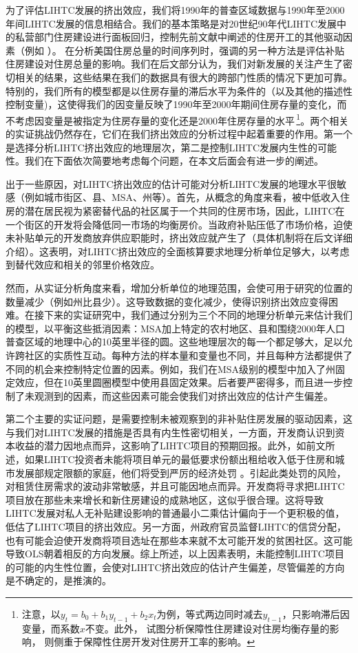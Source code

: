 \documentclass[lang=cn,11pt,a4paper]{paper}
\begin{document}
为了评估LIHTC发展的挤出效应，我们将1990年的普查区域数据与1990年至2000年间LIHTC发展的信息相结合。我们的基本策略是对20世纪90年代LIHTC发展中的私营部门住房建设进行面板回归，控制先前文献中阐述的住房开工的其他驱动因素（例如 \cite{Mayer200085}）。\cite{Murray1999107} 在分析美国住房总量的时间序列时，强调的另一种方法是评估补贴住房建设对住房总量的影响。我们在后文部分认为，我们对新发展的关注产生了密切相关的结果，这些结果在我们的数据具有很大的跨部门性质的情况下更加可靠。特别的，我们所有的模型都是以住房存量的滞后水平为条件的（以及其他的描述性控制变量)，这使得我们的因变量反映了1990年至2000年期间住房存量的变化，而不考虑因变量是被指定为住房存量的变化还是2000年住房存量的水平\,\footnote{注意，以$y_t=b_0+b_1y_{t-1}+b_2x_t$为例，等式两边同时减去$y_{t-1}$，只影响滞后因变量，而系数$x$不变。此外，\cite{Murray1999107} 试图分析保障性住房建设对住房均衡存量的影响，\cite{Murray1983590} 则侧重于保障性住房开发对住房开工率的影响。}。两个相关的实证挑战仍然存在，它们在我们挤出效应的分析过程中起着重要的作用。第一个是选择分析LIHTC挤出效应的地理层次，第二是控制LIHTC发展内生性的可能性。我们在下面依次简要地考虑每个问题，在本文后面会有进一步的阐述。

出于一些原因，对LIHTC挤出效应的估计可能对分析LIHTC发展的地理水平很敏感（例如城市街区、县、MSA、州等）。首先，从概念的角度来看，被中低收入住房的潜在居民视为紧密替代品的社区属于一个共同的住房市场，因此，LIHTC在一个街区的开发将会降低同一市场的均衡房价。当政府补贴压低了市场价格，迫使未补贴单元的开发商放弃供应职能时，挤出效应就产生了（具体机制将在后文详细介绍）。这表明，对LIHTC挤出效应的全面核算要求地理分析单位足够大，以考虑到替代效应和相关的邻里价格效应。

然而，从实证分析角度来看，增加分析单位的地理范围，会使可用于研究的位置的数量减少（例如州比县少）。这导致数据的变化减少，使得识别挤出效应变得困难。在接下来的实证研究中，我们通过分别为三个不同的地理分析单元来估计我们的模型，以平衡这些抵消因素：MSA加上特定的农村地区、县和围绕2000年人口普查区域的地理中心的10英里半径的圆。这些地理层次的每一个都足够大，足以允许跨社区的实质性互动。每种方法的样本量和变量也不同，并且每种方法都提供了不同的机会来控制特定位置的因素。例如，我们在MSA级别的模型中加入了州固定效应，但在10英里圆圈模型中使用县固定效果。后者要严密得多，而且进一步控制了未观测到的因素，而这些因素可能会使我们对挤出效应的估计产生偏差。

第二个主要的实证问题，是需要控制未被观察到的非补贴住房发展的驱动因素，这与我们对LIHTC发展的措施是否具有内生性密切相关，一方面，开发商认识到资本收益的潜力因地点而异，这影响了LIHTC项目的预期回报。此外，如前文所述，如果LIHTC投资者未能将项目单元的最低要求份额出租给收入低于住房和城市发展部规定限额的家庭，他们将受到严厉的经济处罚 \citep{Eriksen2009141}。引起此类处罚的风险，对租赁住房需求的波动非常敏感，并且可能因地点而异。开发商将寻求把LIHTC项目放在那些未来增长和新住房建设的成熟地区，这似乎很合理。这将导致LIHTC发展对私人无补贴建设影响的普通最小二乘估计偏向于一个更积极的值，低估了LIHTC项目的挤出效应。另一方面，州政府官员监督LIHTC的信贷分配，也有可能会迫使开发商将项目选址在那些本来就不太可能开发的贫困社区。这可能导致OLS朝着相反的方向发展。综上所述，以上因素表明，未能控制LIHTC项目的可能的内生性位置，会使对LIHTC挤出效应的估计产生偏差，尽管偏差的方向是不确定的，是推演的。
\end{document}
